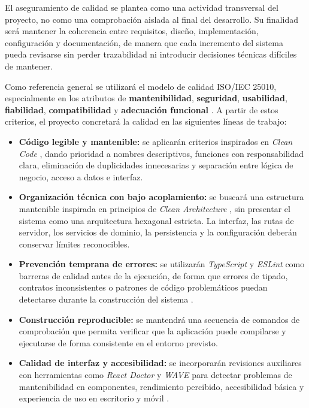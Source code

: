 El aseguramiento de calidad se plantea como una actividad transversal del proyecto, no como una comprobación aislada al final del desarrollo. Su finalidad será mantener la coherencia entre requisitos, diseño, implementación, configuración y documentación, de manera que cada incremento del sistema pueda revisarse sin perder trazabilidad ni introducir decisiones técnicas difíciles de mantener.

Como referencia general se utilizará el modelo de calidad ISO/IEC 25010, especialmente en los atributos de \textbf{mantenibilidad}, \textbf{seguridad}, \textbf{usabilidad}, \textbf{fiabilidad}, \textbf{compatibilidad} y \textbf{adecuación funcional} \citep{iso25010}. A partir de estos criterios, el proyecto concretará la calidad en las siguientes líneas de trabajo:

\begin{itemize}
    \item \textbf{Código legible y mantenible:} se aplicarán criterios inspirados en \textit{Clean Code} \citep{martin2008cleancode}, dando prioridad a nombres descriptivos, funciones con responsabilidad clara, eliminación de duplicidades innecesarias y separación entre lógica de negocio, acceso a datos e interfaz.
    \item \textbf{Organización técnica con bajo acoplamiento:} se buscará una estructura mantenible inspirada en principios de \textit{Clean Architecture} \citep{martin2017cleanarchitecture}, sin presentar el sistema como una arquitectura hexagonal estricta. La interfaz, las rutas de servidor, los servicios de dominio, la persistencia y la configuración deberán conservar límites reconocibles.
    \item \textbf{Prevención temprana de errores:} se utilizarán \textit{TypeScript} y \textit{ESLint} como barreras de calidad antes de la ejecución, de forma que errores de tipado, contratos inconsistentes o patrones de código problemáticos puedan detectarse durante la construcción del sistema \citep{typescriptdocs2026,eslintdocs2026}.
    \item \textbf{Construcción reproducible:} se mantendrá una secuencia de comandos de comprobación que permita verificar que la aplicación puede compilarse y ejecutarse de forma consistente en el entorno previsto.
    \item \textbf{Calidad de interfaz y accesibilidad:} se incorporarán revisiones auxiliares con herramientas como \textit{React Doctor} y \textit{WAVE} para detectar problemas de mantenibilidad en componentes, rendimiento percibido, accesibilidad básica y experiencia de uso en escritorio y móvil \citep{reactdoctor2026,wavewebaim2026}.
\end{itemize}

